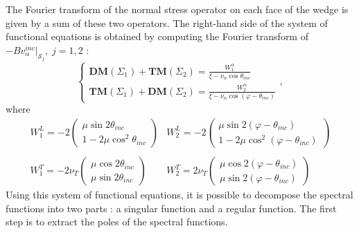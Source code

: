 The Fourier transform of the normal stress operator on each face of the wedge is given by a sum of these two operators. The right-hand side of the system of functional equations is obtained by computing the Fourier transform of $-Bv_{\alpha}^{inc}|_{\mathcal{S}_j},\; j=1,2$ :
\begin{equation}
\left\{
\begin{matrix}
\textbf{DM}(\Sigma_1)+\textbf{TM}(\Sigma_2)=\frac{W_1^{\alpha}}{\xi-\nu_{\alpha} \cos \theta_{inc}} \\
\textbf{TM}(\Sigma_1)+\textbf{DM}(\Sigma_2)=\frac{W_2^{\alpha}}{\xi-\nu_{\alpha}\cos(\varphi-\theta_{inc})}
\end{matrix}
\right.,
\label{equationsintegrales}
\end{equation}
where
\begin{equation}
\begin{matrix}
W_1^L=-2\begin{pmatrix}
\mu \sin 2\theta_{inc}\\
1-2\mu\cos^2\theta_{inc}
\end{pmatrix}&
W_2^L=-2\begin{pmatrix}
\mu \sin 2(\varphi-\theta_{inc}) \\
1-2\mu\cos^2(\varphi-\theta_{inc})
\end{pmatrix} \\
~
\\
W_1^T=-2 \nu_T \begin{pmatrix}
\mu \cos 2\theta_{inc}\\
\mu \sin 2\theta_{inc}
\end{pmatrix}&
W_2^T=2\nu_T \begin{pmatrix}
\mu \cos 2(\varphi-\theta_{inc})\\
\mu \sin 2(\varphi-\theta_{inc})
\end{pmatrix}
\end{matrix}
\end{equation}
Using this system of functional equations, it is possible to decompose the spectral functions into two parts : a singular function and a regular function. The first step is to extract the poles of the spectral functions.

